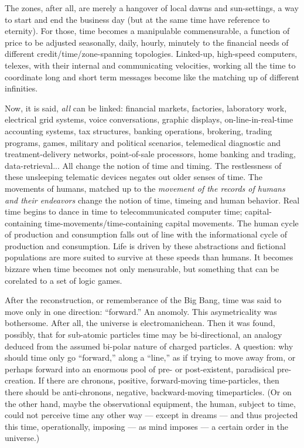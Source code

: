 The zones, after all, are merely a hangover of local dawns and sun-settings, a way to start and end the business day (but at the same time have reference to eternity). For those, time becomes a manipulable commensurable, a function of price to be adjusted seasonally, daily, hourly, minutely to the financial needs of different credit\slash time\slash zone-spanning topologies. Linked-up, high-speed computers, telexes, with their internal and communicating velocities, working all the time to coordinate long and short term messages become like the matching up of different infinities.

Now, it is said, \emph{all} can be linked: financial markets, factories, laboratory work, electrical grid systems, voice conversations, graphic displays, on-line-in-real-time accounting systems, tax structures, banking operations, brokering, trading programs, games, military and political scenarios, telemedical diagnostic and treatment-delivery networks, point-of-sale processors, home banking and trading, data-retrieval... All change the notion of time and timing. The restlessness of these unsleeping telematic devices negates out older senses of time. The movements of humans, matched up to the \emph{movement of the records of humans and their endeavors} change the notion of time, timeing and human behavior. Real time begins to dance in time to telecommunicated computer time; capital-containing time-movements\slash time-containing capital movements. The human cycle of production and consumption falls out of line with the informational cycle of production and consumption. Life is driven by these abstractions and fictional populations are more suited to survive at these speeds than humans. It becomes bizzare when time becomes not only mensurable, but something that can be corelated to a set of logic games.

After the reconstruction, or rememberance of the Big Bang, time was said to move only in one direction: \enquote{forward.} An anomoly. This asymetricality was bothersome. After all, the universe is electromanichean. Then it was found, possibly, that for sub-atomic particles time may be bi-directional, an analogy deduced from the assumed bi-polar nature of charged particles. A question: why should time only go \enquote{forward,} along a \enquote{line,} as if trying to move away from, or perhaps forward into an enormous pool of pre- or post-existent, paradisical pre-creation. If there are chronons, positive, forward-moving time-particles, then there should be anti-chronons, negative, backward-moving timeparticles. (Or on the other hand, maybe the observational equipment, the human, subject to time, could not perceive time any other way --- except in dreams --- and thus projected this time, operationally, imposing --- as mind imposes --- a certain order in the universe.)

